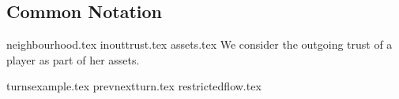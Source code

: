\subsection{Common Notation}
{neighbourhood.tex}
{inouttrust.tex}
\newpage 
{assets.tex}
We consider the outgoing trust of a player as part of her assets.

{turnsexample.tex}
{prevnextturn.tex}
{restrictedflow.tex}
